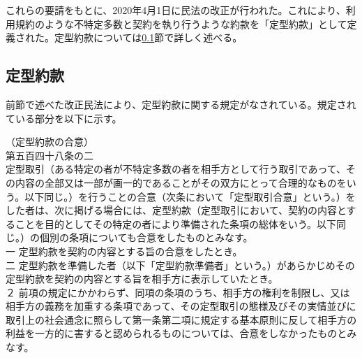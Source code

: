 これらの要請をもとに、2020年4月1日に民法の改正が行われた。これにより、利用規約のような不特定多数と契約を執り行うような約款を「定型約款」として定義された。定型約款については\ref{sub:定型約款}節で詳しく述べる。

\subsection{定型約款}
\label{sub:定型約款}
前節で述べた改正民法により、定型約款に関する規定がなされている。規定されている部分を以下に示す。

\begin{screen}
  （定型約款の合意）\\
  第五百四十八条の二\\
  定型取引（ある特定の者が不特定多数の者を相手方として行う取引であって、その内容の全部又は一部が画一的であることがその双方にとって合理的なものをいう。以下同じ。）を行うことの合意（次条において「定型取引合意」という。）をした者は、次に掲げる場合には、定型約款（定型取引において、契約の内容とすることを目的としてその特定の者により準備された条項の総体をいう。以下同じ。）の個別の条項についても合意をしたものとみなす。\\
  \quad 一 定型約款を契約の内容とする旨の合意をしたとき。\\
  \quad 二 定型約款を準備した者（以下「定型約款準備者」という。）があらかじめその定\qquad 型約款を契約の内容とする旨を相手方に表示していたとき。\\
  ２ 前項の規定にかかわらず、同項の条項のうち、相手方の権利を制限し、又は相手方の義務を加重する条項であって、その定型取引の態様及びその実情並びに取引上の社会通念に照らして第一条第二項に規定する基本原則に反して相手方の利益を一方的に害すると認められるものについては、合意をしなかったものとみなす。
\end{screen}

